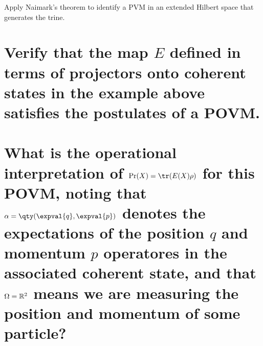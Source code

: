 \documentclass[
	pages,
	boxes,
	color=RoyalPurple
]{homework}
\makeatletter
\numberwithin{tcb@cnt@prob}{section}
\makeatother
\begin{document}
\begin{problem}
Apply Naimark's theorem to identify a \ac{PVM} in an extended Hilbert space that generates the trine.
\end{problem}

\begin{solution}
\end{solution}

\begin{problem}
\begin{parts}
    \part{Verify that the map $E$ defined in terms of projectors onto coherent states in the example above satisfies the postulates of a \ac{POVM}.}\label{part:33a}
    \part{What is the operational interpretation of $\Pr(X) = \tr(E(X)\rho)$ for this \ac{POVM}, noting that $\alpha = \qty(\expval{q}, \expval{p})$ denotes the expectations of the position $q$ and momentum $p$ operatores in the associated coherent state, and that $\Omega = \mathbb{R}^2$ means we are measuring the position and momentum of some particle?}\label{part:33b}
\end{parts}
\end{problem}

\begin{solution}
    \ref{part:33a}
    \ref{part:33b}
\end{solution}
\end{document}
